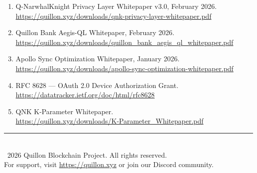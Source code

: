 \documentclass[11pt,a4paper]{article}
\begin{document}
\begin{enumerate}[nosep]
    \item Q-NarwhalKnight Privacy Layer Whitepaper v3.0, February 2026.\\
          \url{https://quillon.xyz/downloads/qnk-privacy-layer-whitepaper.pdf}
    \item Quillon Bank Aegis-QL Whitepaper, February 2026.\\
          \url{https://quillon.xyz/downloads/quillon_bank_aegis_ql_whitepaper.pdf}
    \item Apollo Sync Optimization Whitepaper, January 2026.\\
          \url{https://quillon.xyz/downloads/apollo-sync-optimization-whitepaper.pdf}
    \item RFC 8628 --- OAuth 2.0 Device Authorization Grant.\\
          \url{https://datatracker.ietf.org/doc/html/rfc8628}
    \item QNK K-Parameter Whitepaper.\\
          \url{https://quillon.xyz/downloads/K-Parameter_Whitepaper.pdf}
\end{enumerate}

\vspace{1cm}
\begin{center}
\color{gray}\rule{0.5\textwidth}{0.4pt}\\[0.5cm]
{\small\color{gray} \textcopyright\ 2026 Quillon Blockchain Project. All rights reserved.\\
For support, visit \url{https://quillon.xyz} or join our Discord community.}
\end{center}
\end{document}
